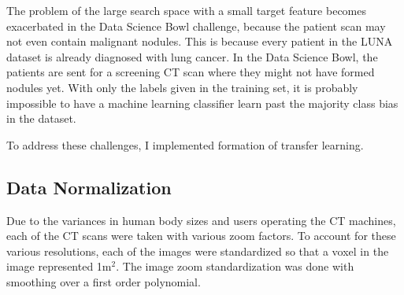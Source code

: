 \documentclass[conference,11pt]{IEEEtran}
\begin{document}
The problem of the large search space with a small target feature becomes exacerbated in the Data Science Bowl challenge, because the patient scan may not even contain malignant nodules. This is because every patient in the LUNA dataset is already diagnosed with lung cancer. In the Data Science Bowl, the patients are sent for a screening CT scan where they might not have formed nodules yet. With only the labels given in the training set, it is probably impossible to have a machine learning classifier learn past the majority class bias in the dataset.

To address these challenges, I implemented formation of transfer learning.

\subsection{Data Normalization}

Due to the variances in human body sizes and users operating the CT machines, each of the CT scans were taken with various zoom factors. To account for these various resolutions, each of the images were standardized so that a voxel in the image represented 1m$^2$. The image zoom standardization was done with smoothing over a first order polynomial.
\end{document}

